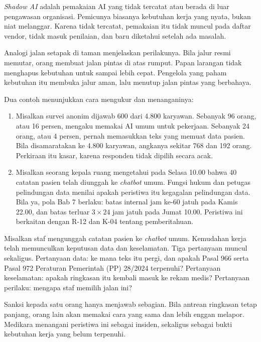 \textit{Shadow AI} adalah pemakaian AI yang tidak tercatat atau berada di luar pengawasan
organisasi. Pemicunya biasanya kebutuhan kerja yang nyata, bukan niat melanggar. Karena tidak
tercatat, pemakaian itu tidak muncul pada daftar vendor, tidak masuk penilaian, dan baru diketahui
setelah ada masalah.

Analogi jalan setapak di taman menjelaskan perilakunya. Bila jalur resmi memutar, orang membuat
jalan pintas di atas rumput. Papan larangan tidak menghapus kebutuhan untuk sampai lebih cepat.
Pengelola yang paham kebutuhan itu membuka jalur aman, lalu menutup jalan pintas yang berbahaya.

Dua contoh menunjukkan cara mengukur dan menanganinya:
\begin{enumerate}
  \item Misalkan survei anonim dijawab 600 dari 4.800 karyawan. Sebanyak 96 orang, atau 16 persen,
  mengaku memakai AI umum untuk pekerjaan. Sebanyak 24 orang, atau 4 persen, pernah memasukkan teks
  yang memuat data pasien. Bila disamaratakan ke 4.800 karyawan, angkanya sekitar 768 dan 192
  orang. Perkiraan itu kasar, karena responden tidak dipilih secara acak.
  \item Misalkan seorang kepala ruang mengetahui pada Selasa 10.00 bahwa 40 catatan pasien telah
  diunggah ke \textit{chatbot} umum. Fungsi hukum dan petugas pelindungan data menilai apakah
  peristiwa itu kegagalan pelindungan data. Bila ya, pola Bab 7 berlaku: batas internal jam ke-60
  jatuh pada Kamis 22.00, dan batas terluar $3 \times 24$ jam jatuh pada Jumat 10.00. Peristiwa
  ini berkaitan dengan R-12 dan K-04 tentang pemberitahuan.
\end{enumerate}

\begin{kasus}[title={Kasus Medikara Health: Catatan Pasien di Chatbot Umum}]
Misalkan staf mengunggah catatan pasien ke \textit{chatbot} umum. Kemudahan kerja telah memunculkan
keputusan data dan keselamatan. Tiga pertanyaan muncul sekaligus. Pertanyaan data: ke mana teks itu
pergi, dan apakah Pasal 966 serta Pasal 972 Peraturan Pemerintah (PP) 28/2024 terpenuhi? Pertanyaan
keselamatan: apakah ringkasan itu kembali masuk ke rekam medis? Pertanyaan perilaku: mengapa staf
memilih jalan ini?

Sanksi kepada satu orang hanya menjawab sebagian. Bila antrean ringkasan tetap panjang, orang lain
akan memakai cara yang sama dan lebih enggan melapor. Medikara menangani peristiwa ini sebagai
insiden, sekaligus sebagai bukti kebutuhan kerja yang belum terpenuhi.
\end{kasus}

